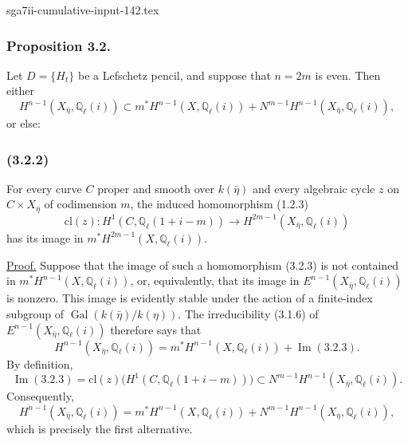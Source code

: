 \begin{filecontents*}{sga7ii-cumulative-input-142.tex}
\subsubsection*{Proposition 3.2.}
Let $D=\{H_t\}$ be a Lefschetz pencil, and suppose that $n=2m$ is even.
Then either
\begin{equation}\tag{3.2.1}
H^{n-1}(X_{\bar\eta},\mathbb Q_\ell(i))
\subset m^*H^{n-1}(X,\mathbb Q_\ell(i))
+N^{m-1}H^{n-1}(X_{\bar\eta},\mathbb Q_\ell(i)),
\end{equation}
or else:

\subsubsection*{(3.2.2)}
For every curve $C$ proper and smooth over $k(\bar\eta)$ and every
algebraic cycle $z$ on $C\times X_{\bar\eta}$ of codimension $m$, the
induced homomorphism (1.2.3)
\begin{equation}\tag{3.2.3}
\mathrm{cl}(z):H^1(C,\mathbb Q_\ell(1+i-m))
\longrightarrow H^{2m-1}(X_{\bar\eta},\mathbb Q_\ell(i))
\end{equation}
has its image in $m^*H^{2m-1}(X,\mathbb Q_\ell(i))$.

\noindent\underline{Proof.}
Suppose that the image of such a homomorphism (3.2.3) is not contained in
$m^*H^{n-1}(X,\mathbb Q_\ell(i))$, or, equivalently, that its image in
$E^{n-1}(X_{\bar\eta},\mathbb Q_\ell(i))$ is nonzero.  This image is
evidently stable under the action of a finite-index subgroup of
$\operatorname{Gal}(k(\bar\eta)/k(\eta))$.  The irreducibility (3.1.6) of
$E^{n-1}(X_{\bar\eta},\mathbb Q_\ell(i))$ therefore says that
\begin{equation*}
H^{n-1}(X_{\bar\eta},\mathbb Q_\ell(i))
=m^*H^{n-1}(X,\mathbb Q_\ell(i))+\operatorname{Im}(3.2.3).
\end{equation*}
By definition,
\begin{equation*}
\operatorname{Im}(3.2.3)
=\mathrm{cl}(z)\bigl(H^1(C,\mathbb Q_\ell(1+i-m))\bigr)
\subset N^{m-1}H^{n-1}(X_{\bar\eta},\mathbb Q_\ell(i)).
\end{equation*}
Consequently,
\begin{equation*}
H^{n-1}(X_{\bar\eta},\mathbb Q_\ell(i))
=m^*H^{n-1}(X,\mathbb Q_\ell(i))
+N^{m-1}H^{n-1}(X_{\bar\eta},\mathbb Q_\ell(i)),
\end{equation*}
which is precisely the first alternative.
\end{filecontents*}
